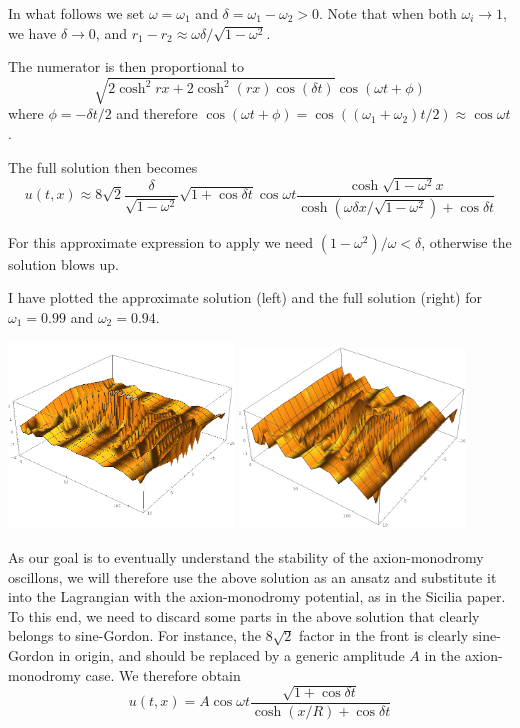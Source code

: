 \documentclass{report}
\begin{document}
In what follows we set $\omega=\omega_1$ and $\delta=\omega_1-\omega_2>0$. Note that when both $\omega_i\to1$, we have $\delta\to0$, and $r_1-r_2\approx \omega \delta/\sqrt{1-\omega^2}$.

The numerator is then proportional to
\begin{equation}
  \sqrt{2\cosh^2 rx + 2\cosh^2 (rx) \cos(\delta t)}\cos(\omega t+\phi)
\end{equation}
where $\phi = -\delta t/2$ and therefore $\cos(\omega t+\phi)=\cos((\omega_1+\omega_2)t/2)\approx\cos\omega t$.

The full solution then becomes
\begin{equation}
  u(t,x) \approx 8\sqrt{2}  \frac{\delta}{\sqrt{1-\omega^2}} \sqrt{1+\cos\delta t} \cos\omega t \frac{\cosh \sqrt{1-\omega^2} x}{\cosh(\omega\delta x/\sqrt{1-\omega^2}) + \cos \delta t}
\end{equation}

For this approximate expression to apply we need $(1-\omega^2)/\omega < \delta$, otherwise the solution blows up.

I have plotted the approximate solution (left) and the full solution (right) for $\omega_1=0.99$ and $\omega_2=0.94$.

\begin{center}
  \includegraphics[width=6cm]{plot/small-approx.png}
  \includegraphics[width=6cm]{plot/small-full.png}
\end{center}

\medbreak

As our goal is to eventually understand the stability of the axion-monodromy oscillons, we will therefore use the above solution as an ansatz and substitute it into the Lagrangian with the axion-monodromy potential, as in the Sicilia paper. To this end, we need to discard some parts in the above solution that clearly belongs to sine-Gordon. For instance, the $8\sqrt{2}$ factor in the front is clearly sine-Gordon in origin, and should be replaced by a generic amplitude $A$ in the axion-monodromy case. We therefore obtain
\begin{equation}
  u(t,x) = A \cos\omega t \frac{\sqrt{1+\cos\delta t}}{\cosh (x/R) + \cos \delta t}
\end{equation}
\end{document}
